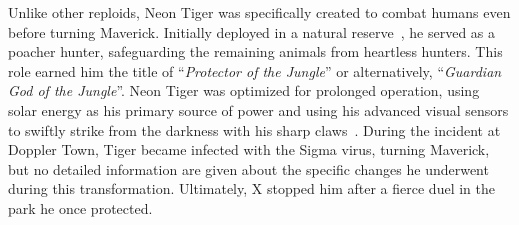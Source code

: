Unlike other reploids, Neon Tiger was specifically created to combat humans even before turning Maverick. Initially deployed in a natural reserve~\cite{wiki:Neon_tiger}, he served as a poacher hunter, safeguarding the remaining animals from heartless hunters. This role earned him the title of ``\textit{Protector of the Jungle}''\cite{book:MMX_Complete_art} or alternatively, ``\textit{Guardian God of the Jungle}''\cite{wayback:X3_resources}. Neon Tiger was optimized for prolonged operation, using solar energy as his primary source of power and using his advanced visual sensors to swiftly strike from the darkness with his sharp claws~\cite{wayback:X3_resources,Xcoll1:Manual_X3}. During the incident at Doppler Town, Tiger became infected with the Sigma virus, turning Maverick, but  no detailed information are given about the specific changes he underwent during this transformation. Ultimately, X stopped him after a fierce duel in the park he once protected.
